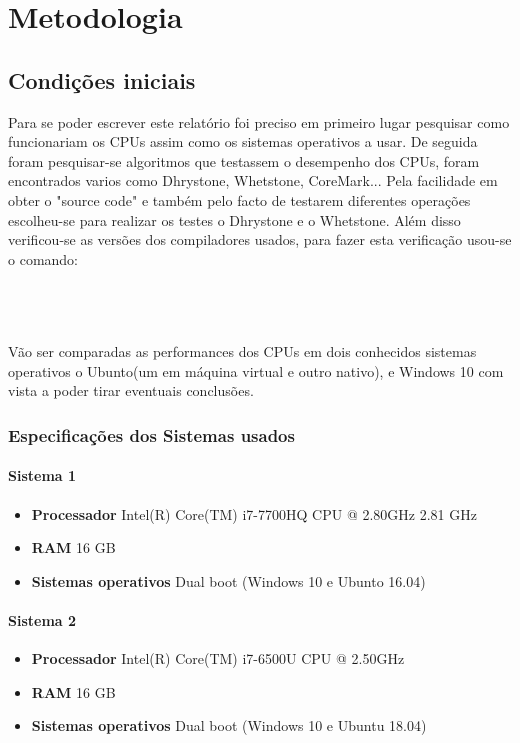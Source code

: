 \documentclass{report}
\newcommand{\lin}[1]{\centerline{\fbox{\texttt{#1}}}}
\begin{document}
\chapter{Metodologia}
\label{chap.metodologia}
\section{Condições iniciais}
Para se poder escrever este relatório foi preciso em primeiro lugar pesquisar como funcionariam os CPUs assim como os sistemas operativos a usar.
De seguida foram pesquisar-se algoritmos que testassem o desempenho dos  CPUs, foram encontrados varios como Dhrystone, Whetstone, CoreMark... Pela facilidade em obter o "source code" e também pelo facto de testarem diferentes operações escolheu-se para realizar os testes o Dhrystone e o Whetstone.
Além disso verificou-se as versões dos compiladores usados, para fazer esta verificação usou-se o comando:
\\
\\
\lin{gcc -v}
\\
\\
Vão ser comparadas as performances dos CPUs em dois conhecidos sistemas operativos o Ubunto(um em máquina virtual e outro nativo), e Windows 10 com vista a poder tirar eventuais conclusões.
\subsection{Especificações dos Sistemas usados}
\subsubsection{Sistema 1}
\begin{itemize}
\item \textbf{Processador} Intel(R) Core(TM) i7-7700HQ CPU @ 2.80GHz 2.81 GHz
\item \textbf{RAM} 16 GB
\item \textbf{Sistemas operativos} Dual boot (Windows 10 e Ubunto 16.04)



\end{itemize}
\subsubsection{Sistema 2}
 \begin{itemize}
\item \textbf{Processador} Intel(R) Core(TM) i7-6500U CPU @ 2.50GHz 
\item \textbf{RAM} 16 GB 
\item \textbf{Sistemas operativos} Dual boot (Windows 10 e Ubuntu 18.04)
 \end{itemize}
\end{document}
